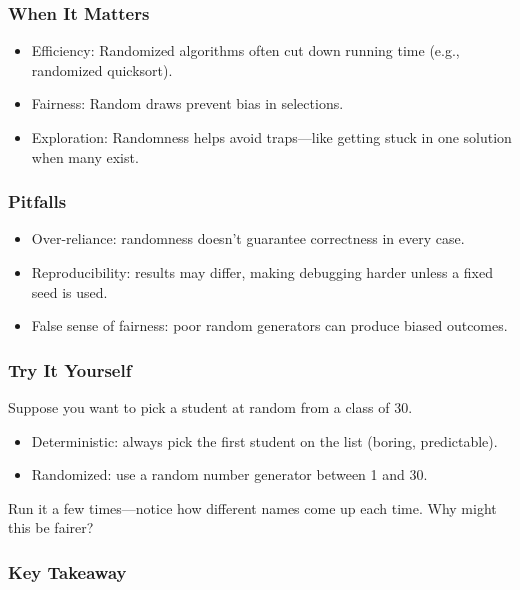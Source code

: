 \documentclass[
  letterpaper,
  DIV=11,
  numbers=noendperiod]{scrreprt}
\providecommand{\tightlist}{%
  \setlength{\itemsep}{0pt}\setlength{\parskip}{0pt}}
\begin{document}
\subsubsection{When It Matters}\label{when-it-matters-22}

\begin{itemize}
\tightlist
\item
  Efficiency: Randomized algorithms often cut down running time (e.g.,
  randomized quicksort).
\item
  Fairness: Random draws prevent bias in selections.
\item
  Exploration: Randomness helps avoid traps---like getting stuck in one
  solution when many exist.
\end{itemize}

\subsubsection{Pitfalls}\label{pitfalls-21}

\begin{itemize}
\tightlist
\item
  Over-reliance: randomness doesn't guarantee correctness in every case.
\item
  Reproducibility: results may differ, making debugging harder unless a
  fixed seed is used.
\item
  False sense of fairness: poor random generators can produce biased
  outcomes.
\end{itemize}

\subsubsection{Try It Yourself}\label{try-it-yourself-24}

Suppose you want to pick a student at random from a class of 30.

\begin{itemize}
\tightlist
\item
  Deterministic: always pick the first student on the list (boring,
  predictable).
\item
  Randomized: use a random number generator between 1 and 30.
\end{itemize}

Run it a few times---notice how different names come up each time. Why
might this be fairer?

\subsubsection{Key Takeaway}\label{key-takeaway-23}
\end{document}
